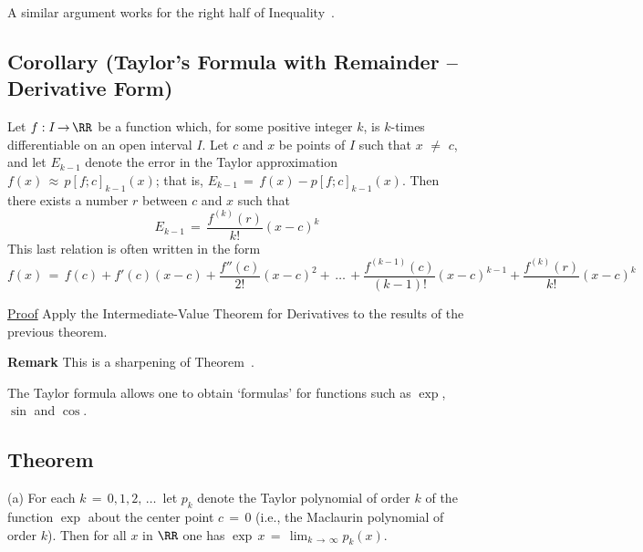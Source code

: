 {    A similar argument works for the right half of Inequality~.

\V

            \subsection{\small{\bf Corollary} (Taylor's Formula with Remainder -- Derivative Form)}
            \label{CorE60.80}

         Let $f:I \,{\rightarrow}\, {\RR}$ be a function which, for some positive integer $k$, is $k$-times differentiable on an open interval $I$.
    Let $c$ and $x$ be points of $I$ such that $x \,\,{\neq}\,\, c$, and let $E_{k-1}$ denote the error in the Taylor approximation $f(x) \,{\approx}\, p[f;c]_{k-1}(x)$;
    that is, $E_{k-1} \,=\, f(x)-p[f;c]_{k-1}(x)$.
    Then there exists a number $r$ between $c$ and $x$ such that
        \begin{equation}
        \label{EqnE.160}
        E_{k-1} \,=\, \frac{f^{(k)}(r)}{k!}(x-c)^{k}
        \end{equation}
    This last relation is often written in the form
        \begin{equation}
        \label{EqnE.170}
        f(x) \,=\, f(c) + f'(c)(x-c) + \frac{f''(c)}{2!}(x-c)^{2} + \,{\ldots}\, + \frac{f^{(k-1)}(c)}{(k-1)!}(x-c)^{k-1} + \frac{f^{(k)}(r)}{k!}(x-c)^{k}
        \end{equation}

\V

        \underline{Proof} Apply the Intermediate-Value Theorem for Derivatives to the results of the previous theorem.

\V

        {\bf Remark} This is a sharpening of Theorem~.


\V
\V

        The Taylor formula allows one to obtain `formulas' for functions such as $\exp$, $\sin$ and $\cos$.

\V

            \subsection{\small{\bf Theorem}}
            \label{ThmE60.85}

\V

\hspace*{\parindent}(a) For each $k \,=\, 0,1,2,\,{\ldots}\,$ let $p_{k}$ denote the Taylor polynomial of order $k$ of the function ${\exp}$ about the center point $c \,=\, 0$ (i.e., the Maclaurin polynomial of order $k$).
    Then for all $x$ in ${\RR}$ one has ${\exp}\,x \,=\, \lim_{k \,{\rightarrow}\, {\infty}} p_{k}(x)$.

}
